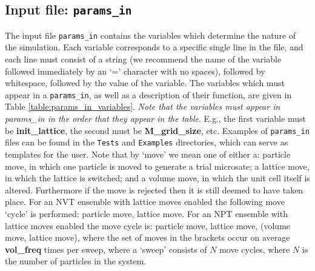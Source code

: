 \documentclass{report}
\begin{document}
\subsection{Input file: \texttt{params\_in}}\label{section:params_in}
The input file \texttt{params\_in} contains the variables which determine the nature of the simulation. Each variable corresponds to a
specific single line in the file, and each line must consist of a string (we recommend the name of the variable followed immediately
by an `=' character with no spaces), followed by whitespace, followed by the value of the variable. The variables which must appear
in a \texttt{params\_in}, as well as a description of their function, are given in Table \ref{table:params_in_variables}. 
\emph{Note that the variables must appear in params\_in in the order that they appear in the table}. E.g., the first 
variable must be \textbf{init\_lattice}, the second must be \textbf{M\_grid\_size}, etc. Examples of \texttt{params\_in} files can
be found in the \texttt{Tests} and \texttt{Examples} directories, which can serve as templates for the user.
%
Note that by `move' we mean one of either a: particle move, in which one particle is moved to generate a trial microsate; a lattice move, in 
which the lattice is switched; and a volume move, in which the unit cell itself is altered. Furthermore if the move is rejected then it is 
still deemed to have taken place. For an NVT ensemble with lattice moves enabled the following move `cycle' is performed: particle move, 
lattice move. For an NPT ensemble with lattice moves enabled the move cycle is: particle move, lattice move, (volume move, lattice move), 
where the set of moves in the brackets occur on average \textbf{vol\_freq} times per sweep, where a `sweep' consists of $N$ move cycles,
where $N$ is the number of particles in the system.
\end{document}
